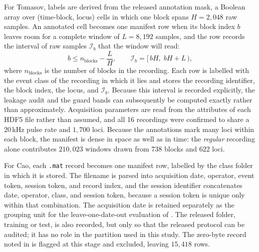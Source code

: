 For Tomasov, labels are derived from the released annotation mask, a Boolean array over (time-block, locus) cells in which one block spans $H = 2{,}048$ raw samples. An annotated cell becomes one manifest row when its block index $b$ leaves room for a complete window of $L = 8{,}192$ samples, and the row records the interval of raw samples $\mathcal{I}_b$ that the window will read:
\begin{equation}
	b \le n_{\mathrm{blocks}} - \frac{L}{H}, \qquad \mathcal{I}_b = \bigl[\, bH,\; bH + L \,\bigr),
	\label{eq:readinterval}
\end{equation}
where $n_{\mathrm{blocks}}$ is the number of blocks in the recording. Each row is labelled with the event class of the recording in which it lies and stores the recording identifier, the block index, the locus, and $\mathcal{I}_b$. Because this interval is recorded explicitly, the leakage audit and the guard bands can subsequently be computed exactly rather than approximately. Acquisition parameters are read from the attributes of each HDF5 file rather than assumed, and all 16 recordings were confirmed to share a 20\,kHz pulse rate and $1{,}700$ loci. Because the annotations mark many loci within each block, the manifest is dense in space as well as in time: the \emph{regular} recording alone contributes $210{,}023$ windows drawn from 738 blocks and 622 loci.

For Cao, each \texttt{.mat} record becomes one manifest row, labelled by the class folder in which it is stored. The filename is parsed into acquisition date, operator, event token, session token, and record index, and the session identifier concatenates date, operator, class, and session token, because a session token is unique only within that combination. The acquisition date is retained separately as the grouping unit for the leave-one-date-out evaluation of . The released folder, training or test, is also recorded, but only so that the released protocol can be audited; it has no role in the partition used in this study. The zero-byte record noted in  is flagged at this stage and excluded, leaving $15{,}418$ rows.

